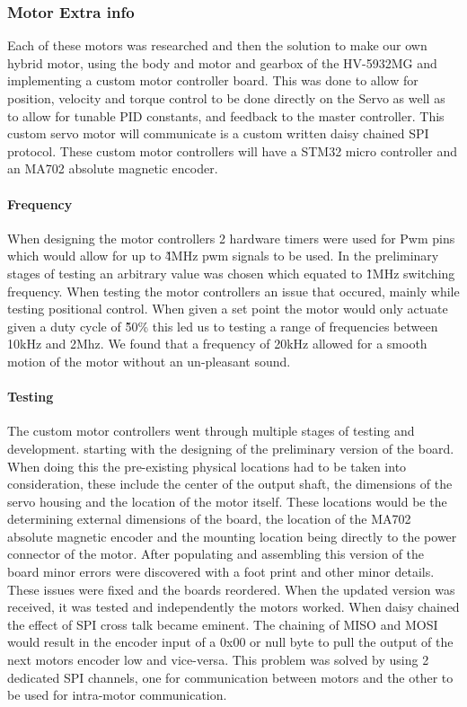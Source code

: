 \subsubsection{Motor Extra info}
 Each of these motors was researched and then the solution to make our own hybrid motor, using the body and motor and gearbox of the HV-5932MG and implementing a custom motor controller board. This was done to allow for position, velocity and torque control to be done directly on the Servo as well as to allow for tunable PID constants, and feedback to the master controller. This custom servo motor will communicate is a custom written daisy chained SPI protocol. These custom motor controllers will have a STM32 micro controller and an MA702 absolute magnetic encoder\cite{MA702}.
\paragraph{Frequency}
When designing the motor controllers 2 hardware timers were used for Pwm pins which would allow for up to \~4MHz pwm signals to be used. In the preliminary stages of testing an arbitrary value was chosen which equated to \~1MHz switching frequency. When testing the motor controllers an issue that occured, mainly while testing positional control. When given a set point the motor would only actuate given a duty cycle of  \~50\% this led us to testing a range of frequencies between 10kHz and 2Mhz. We found that a frequency of 20kHz allowed for a smooth motion of the motor without an un-pleasant sound.  
\paragraph{Testing} 
The custom motor controllers went through multiple stages of testing and development. starting with the designing of the preliminary version of the board. When doing this the pre-existing physical locations had to be taken into consideration, these include the center of the output shaft, the dimensions of the servo housing and the location of the motor itself. These locations would be the determining external dimensions of the board, the location of the MA702 absolute magnetic encoder and the mounting location being directly to the power connector of the motor. After populating and assembling this version of the board minor errors were discovered with a foot print and other minor details. These issues were fixed and the boards reordered. When the updated version was received, it was tested and independently the motors worked. When daisy chained the effect of SPI cross talk became eminent. The chaining of MISO and MOSI would result in the encoder input of a 0x00 or null byte to pull the output of the next motors encoder low and vice-versa. This problem was solved by using 2 dedicated SPI channels, one for communication between motors and the other to be used for intra-motor communication. 

